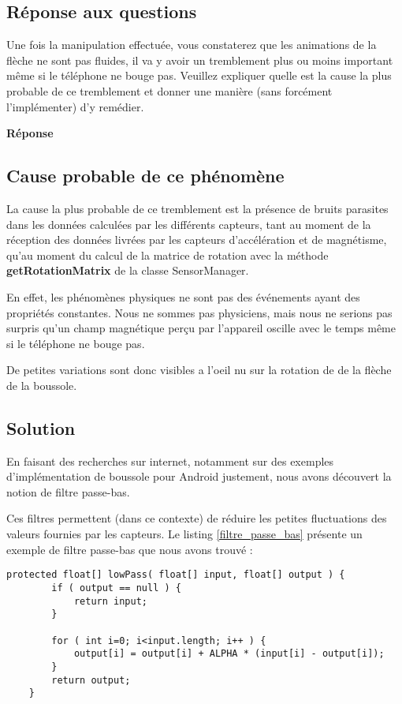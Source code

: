 \documentclass[francais,12pt]{article}
\begin{document}
	\subsection*{Réponse aux questions}
	Une fois la manipulation effectuée, vous constaterez que les animations de la flèche ne sont pas fluides, il va y avoir un tremblement plus ou moins important même si le téléphone ne bouge pas. Veuillez expliquer quelle est la cause la plus probable de ce tremblement et donner une manière (sans forcément l’implémenter) d’y remédier. 
	
	{\color[rgb]{0,0.5,0.23}\textbf{Réponse}}
	
	\subsection*{Cause probable de ce phénomène}
	La cause la plus probable de ce tremblement est la présence de bruits parasites dans les données calculées par les différents capteurs, tant au moment de la réception des données livrées par les capteurs d'accélération et de magnétisme, qu'au moment du calcul de la matrice de rotation avec la méthode \textbf{getRotationMatrix} de la classe SensorManager. 
	
	En effet, les phénomènes physiques ne sont pas des événements ayant des propriétés constantes. Nous ne sommes pas physiciens, mais nous ne serions pas surpris qu'un champ magnétique perçu par l'appareil oscille avec le temps même si le téléphone ne bouge pas. 
	
	De petites variations sont donc visibles a l'oeil nu sur la rotation de de la flèche de la boussole.
	
	\subsection*{Solution}
	En faisant des recherches sur internet, notamment sur des exemples d'implémentation de boussole pour Android justement, nous avons découvert la notion de filtre passe-bas. 
	
	Ces filtres permettent (dans ce contexte) de réduire les petites fluctuations des valeurs fournies par les capteurs. Le listing \ref{filtre_passe_bas} présente un exemple de filtre passe-bas que nous avons trouvé : 
	
	\lstset{escapechar=@,style=JavaCode}
	\begin{lstlisting}[caption={Exemple de filtre passe-bas},label={filtre_passe_bas}]
	protected float[] lowPass( float[] input, float[] output ) {
		if ( output == null ) {
			return input;  
		}
		   
		for ( int i=0; i<input.length; i++ ) {
			output[i] = output[i] + ALPHA * (input[i] - output[i]);
		}
		return output;
	}
	\end{lstlisting}
	
\end{document}

